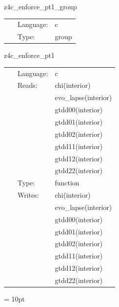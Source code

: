 \documentclass{article}
\begin{document}
\vspace{5mm}


\hspace{5mm} z4c\_enforce\_pt1\_group 

\hspace{5mm}{\it group for function `z4c\_enforce\_pt1`. generated by einsteinengine. } 


\hspace{5mm}

 \begin{tabular*}{160mm}{cll} 
~ & Language:  & c \\ 
~ & Type:  & group \\ 
\end{tabular*} 


\vspace{5mm}


\hspace{5mm} z4c\_enforce\_pt1 

\hspace{5mm}{\it function `z4c\_enforce\_pt1` generated by einsteinengine. } 


\hspace{5mm}

 \begin{tabular*}{160mm}{cll} 
~ & Language:  & c \\ 
~ & Reads:  & chi(interior) \\ 
~& ~ &evo\_lapse(interior)\\ 
~& ~ &gtdd00(interior)\\ 
~& ~ &gtdd01(interior)\\ 
~& ~ &gtdd02(interior)\\ 
~& ~ &gtdd11(interior)\\ 
~& ~ &gtdd12(interior)\\ 
~& ~ &gtdd22(interior)\\ 
~ & Type:  & function \\ 
~ & Writes:  & chi(interior) \\ 
~& ~ &evo\_lapse(interior)\\ 
~& ~ &gtdd00(interior)\\ 
~& ~ &gtdd01(interior)\\ 
~& ~ &gtdd02(interior)\\ 
~& ~ &gtdd11(interior)\\ 
~& ~ &gtdd12(interior)\\ 
~& ~ &gtdd22(interior)\\ 
\end{tabular*} 



\vspace{5mm}\parskip = 10pt 
\end{document}
